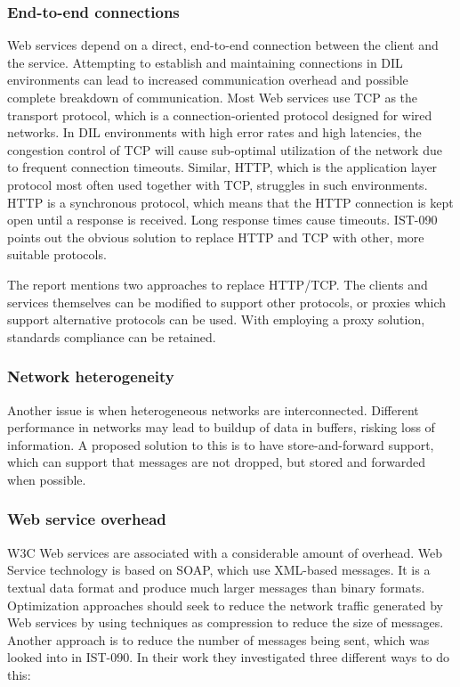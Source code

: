 \label{section:DIL-problems}

\subsubsection{End-to-end connections}

Web services depend on a direct, end-to-end connection between the client and
the service. Attempting to establish and maintaining connections in DIL
environments can lead to increased communication overhead and possible complete
breakdown of communication. Most Web services use TCP as the transport protocol,
which is a connection-oriented protocol designed for wired networks. In DIL
environments with high error rates and high latencies, the congestion control of
TCP will cause sub-optimal utilization of the network due to frequent connection
timeouts. Similar, HTTP, which is the application layer protocol most often
used together with TCP, struggles in such environments. HTTP is a synchronous
protocol, which means that the HTTP connection is kept open until a response is
received. Long response times cause timeouts. IST-090 points out the obvious
solution to replace HTTP and TCP with other, more suitable protocols.

The report\cite{ist-090} mentions two approaches to replace HTTP/TCP. The
clients and services themselves can be modified to support other protocols, or
proxies which support alternative protocols can be used. With employing a proxy
solution, standards compliance can be retained.


\subsubsection{Network heterogeneity}

Another issue is when heterogeneous networks are interconnected. Different
performance in networks may lead to buildup of data in buffers, risking loss of
information. A proposed solution to this is to have store-and-forward support,
which can support that messages are not dropped, but stored and forwarded when
possible.


\subsubsection{Web service overhead}

W3C Web services are associated with a considerable amount of overhead. Web
Service technology is based on SOAP, which use XML-based messages. It is a
textual data format and produce much larger messages than binary formats.
Optimization approaches should seek to reduce the network traffic generated by
Web services by using techniques as compression to reduce the size of messages.
Another approach is to reduce the number of messages being sent, which was
looked into in IST-090\cite{ist-090}. In their work they investigated three
different ways to do this:

